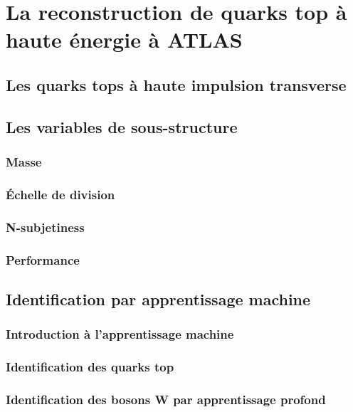 \singlespacing{}
\section{La reconstruction de quarks top à haute énergie à ATLAS}
\label{sec:top}
\doublespacing{}

\subsection{Les quarks tops à haute impulsion transverse}
\label{sec:top:boosted}

\subsection{Les variables de sous-structure}
\label{sec:top:sous_structure}

\subsubsection{Masse}
\label{sec:top:sous_structure:masse}

\subsubsection{Échelle de division}
\label{sec:top:sous_structure:d_ij}

\subsubsection{N-subjetiness}
\label{sec:top:sous_structure:tau_ij}

\subsubsection{Performance}
\label{sec:top:sous_structure:perf}

\subsection{Identification par apprentissage machine}
\label{sec:top:ml}

\subsubsection{Introduction à l'apprentissage machine}
\label{sec:top:ml:intro}

\subsubsection{Identification des quarks top}
\label{sec:top:ml:top}

\subsubsection{Identification des bosons W par apprentissage profond}
\label{sec:top:ml:w}

